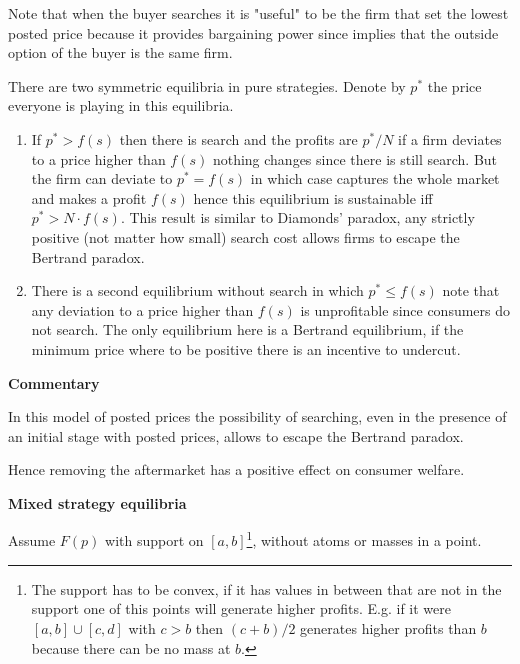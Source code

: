 \documentclass[12pt]{article}
\theoremstyle{plain}
\theoremstyle{plain}
\begin{document}
Note that when the buyer searches it is "useful" to be the firm that set the lowest posted price because it provides bargaining power since implies that the outside option of the buyer is the same firm.  

There are two symmetric equilibria in pure strategies. Denote by $p^*$ the price everyone is playing in this equilibria. 
\begin{enumerate}
    \item If $p^* >f(s)$ then there is search and the profits are $p^*/N$ if a firm deviates to a price higher than $f(s)$ nothing changes since there is still search. But the firm can deviate to $p^*=f(s)$ in which case captures the whole market and makes a profit $f(s)$ hence this equilibrium is sustainable iff $p^*> N \cdot f(s)$. This result is similar to Diamonds' paradox, any strictly positive (not matter how small) search cost allows firms to escape the Bertrand paradox. 
    
    \item There is a second equilibrium without search in which $p^*\leq f(s)$ note that any deviation to a price higher than $f(s)$ is unprofitable since consumers do not search. The only equilibrium here is a Bertrand equilibrium, if the minimum price where to be positive there is an incentive to undercut. 
\end{enumerate}

\textbf{Commentary}

In this model of posted prices the possibility of searching, even in the presence of an initial stage with posted prices,  allows to escape the Bertrand paradox. 

Hence removing the aftermarket has a positive effect on consumer welfare. 


\newpage

\textbf{Mixed strategy equilibria }


Assume $F(p)$ with support on $[a,b]$\footnote{The support has to be convex, if it has values in between that are not in the support one of this points will generate higher profits. E.g. if it were $[a,b] \cup [c,d]$ with $c>b$ then $(c+b)/2$ generates higher profits than $b$ because there can be no mass at $b$.}, without atoms or masses in a point.
\end{document}
